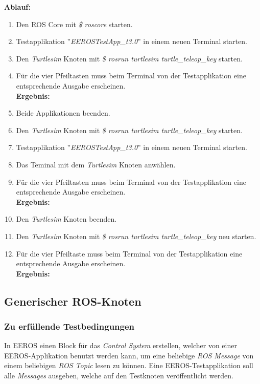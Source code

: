 \textbf{Ablauf: } 
\begin{enumerate}
\item Den ROS Core mit \textit{\$ roscore} starten.
\item Testapplikation ''\textit{EEROSTestApp\_t3.0}'' in einem neuen Terminal starten.
\item Den \textit{Turtlesim} Knoten mit \textit{\$ rosrun turtlesim turtle\_teleop\_key} starten.
\item Für die vier Pfeiltasten muss beim Terminal von der Testapplikation eine entsprechende Ausgabe erscheinen. \\
\textbf{Ergebnis:} \cmark
\item Beide Applikationen beenden.
\item Den \textit{Turtlesim} Knoten mit \textit{\$ rosrun turtlesim turtle\_teleop\_key} starten.
\item Testapplikation ''\textit{EEROSTestApp\_t3.0}'' in einem neuen Terminal starten.
\item Das Teminal mit dem \textit{Turtlesim} Knoten anwählen.
\item Für die vier Pfeiltasten muss beim Terminal von der Testapplikation eine entsprechende Ausgabe erscheinen. \\
\textbf{Ergebnis:} \cmark
\item Den \textit{Turtlesim} Knoten beenden.
\item Den \textit{Turtlesim} Knoten mit \textit{\$ rosrun turtlesim turtle\_teleop\_key} neu starten.
\item Für die vier Pfeiltaste muss beim Terminal von der Testapplikation eine entsprechende Ausgabe erscheinen. \\
\textbf{Ergebnis:} \cmark
\end{enumerate}


\subsection{Generischer ROS-Knoten}
\subsubsection{Zu erfüllende Testbedingungen}
In EEROS einen Block für das \textit{Control System} erstellen, welcher von einer EEROS-Applikation benutzt werden kann, um eine beliebige \textit{ROS Message} von einem beliebigen \textit{ROS Topic} lesen zu können.
Eine EEROS-Testapplikation soll alle \textit{Messages} ausgeben, welche auf den Testknoten veröffentlicht werden.

